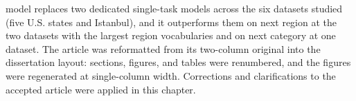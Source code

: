 \begin{chapterpreface}
model replaces two dedicated single-task
models across the six datasets studied (five U.S. states and Istanbul), and it
outperforms them on next region at the two datasets with the largest region
vocabularies and on next category at one dataset. The article was
reformatted from its two-column original into the dissertation layout: sections,
figures, and tables were renumbered, and the figures were regenerated at
single-column width.
Corrections and clarifications to the accepted article were applied in this chapter.
\end{chapterpreface}









